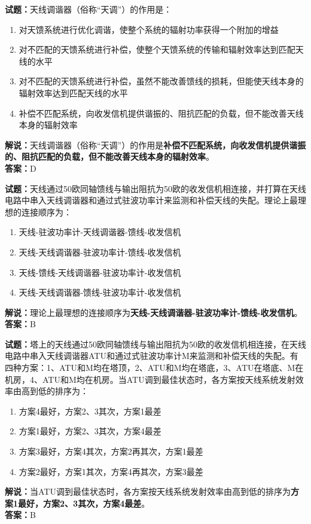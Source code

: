 \documentclass{ctexbook}
\begin{document}
\vspace{1em}

\textbf{试题：}天线调谐器（俗称“天调”）的作用是：
\begin{enumerate}[leftmargin=3em]
  \item 对天馈系统进行优化调谐，使整个系统的辐射功率获得一个附加的增益
  \item 对不匹配的天馈系统进行补偿，使整个天馈系统的传输和辐射效率达到匹配天线的水平
  \item 对不匹配的天馈系统进行补偿，虽然不能改善馈线的损耗，但能使天线本身的辐射效率达到匹配天线的水平
  \item 补偿不匹配系统，向收发信机提供谐振的、阻抗匹配的负载，但不能改善天线本身的辐射效率
\end{enumerate}
\noindent\textbf{解说：}天线调谐器（俗称“天调”）的作用是\textbf{补偿不匹配系统，向收发信机提供谐振的、阻抗匹配的负载，但不能改善天线本身的辐射效率}。\\\noindent\textbf{答案：}D

\vspace{1em}

\textbf{试题：}天线通过50欧同轴馈线与输出阻抗为50欧的收发信机相连接，并打算在天线电路中串入天线调谐器和通过式驻波功率计来监测和补偿天线的失配。理论上最理想的连接顺序为：
\begin{enumerate}[leftmargin=3em]
  \item 天线-驻波功率计-天线调谐器-馈线-收发信机
  \item 天线-天线调谐器-驻波功率计-馈线-收发信机
  \item 天线-馈线-天线调谐器-驻波功率计-收发信机
  \item 天线-天线调谐器-馈线-驻波功率计-收发信机
\end{enumerate}
\noindent\textbf{解说：}理论上最理想的连接顺序为\textbf{天线-天线调谐器-驻波功率计-馈线-收发信机}。\\\noindent\textbf{答案：}B

\vspace{1em}

\textbf{试题：}塔上的天线通过50欧同轴馈线与输出阻抗为50欧的收发信机相连接，在天线电路中串入天线调谐器ATU和通过式驻波功率计M来监测和补偿天线的失配。有四种方案：1、ATU和M均在塔顶，2、ATU和M均在塔底，3、ATU在塔底、M在机房，4、ATU和M均在机房。当ATU调到最佳状态时，各方案按天线系统发射效率由高到低的排序为：
\begin{enumerate}[leftmargin=3em]
  \item 方案4最好，方案2、3其次，方案1最差
  \item 方案1最好，方案2、3其次，方案4最差
  \item 方案3最好，方案4其次，方案2再其次，方案1最差
  \item 方案2最好，方案1其次，方案4再其次，方案3最差
\end{enumerate}
\noindent\textbf{解说：}当ATU调到最佳状态时，各方案按天线系统发射效率由高到低的排序为\textbf{方案1最好，方案2、3其次，方案4最差}。\\\noindent\textbf{答案：}B
\end{document}
